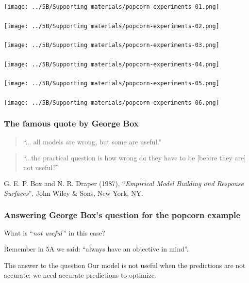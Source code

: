 \begin{frame}\frametitle{}
	\centerline{\texttt{[image: ../5B/Supporting materials/popcorn-experiments-01.png]}}
\end{frame}
\begin{frame}\frametitle{}
	\centerline{\texttt{[image: ../5B/Supporting materials/popcorn-experiments-02.png]}}
\end{frame}
\begin{frame}\frametitle{}
	\centerline{\texttt{[image: ../5B/Supporting materials/popcorn-experiments-03.png]}}
\end{frame}
\begin{frame}\frametitle{}
	\centerline{\texttt{[image: ../5B/Supporting materials/popcorn-experiments-04.png]}}
\end{frame}
\begin{frame}\frametitle{}
	\centerline{\texttt{[image: ../5B/Supporting materials/popcorn-experiments-05.png]}}
\end{frame}
\begin{frame}\frametitle{}
	\centerline{\texttt{[image: ../5B/Supporting materials/popcorn-experiments-06.png]}}
\end{frame}
\begin{frame}\frametitle{The famous quote by George Box}
	\begin{quote}
		``... all models are wrong, but some are useful.''
	\end{quote}
	
	\begin{quote}
		``...the practical question is how wrong do they have to be [before they are] not useful?''
	\end{quote}
	
	\vspace{1cm}
	G. E. P. Box and  N. R. Draper (1987), ``\emph{Empirical Model Building and Response Surfaces}'', John Wiley \& Sons, New York, NY.
\end{frame}
\begin{frame}\frametitle{Answering George Box's question for the popcorn example}
	
	What is ``\emph{not useful}\,'' in this case?
	
	\vspace{1cm}
	Remember in 5A we said: ``always have an objective in mind''.
	
	\vspace{1cm}
	\begin{exampleblock}{The answer to the question}
		Our model is not useful when the predictions are not accurate; we need accurate predictions to optimize.
	\end{exampleblock}
\end{frame}
